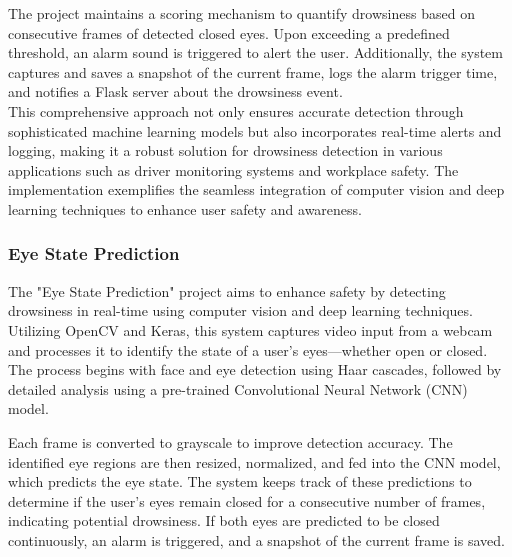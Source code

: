 \documentclass[12pt]{article}
\begin{document}
The project maintains a scoring mechanism to quantify drowsiness based on consecutive frames of detected closed eyes. Upon exceeding a predefined threshold, an alarm sound is triggered to alert the user. Additionally, the system captures and saves a snapshot of the current frame, logs the alarm trigger time, and notifies a Flask server about the drowsiness event. \\
This comprehensive approach not only ensures accurate detection through sophisticated machine learning models but also incorporates real-time alerts and logging, making it a robust solution for drowsiness detection in various applications such as driver monitoring systems and workplace safety. The implementation exemplifies the seamless integration of computer vision and deep learning techniques to enhance user safety and awareness.


\subsubsection{Eye State Prediction } 
The "Eye State Prediction" project aims to enhance safety by detecting drowsiness in real-time using computer vision and deep learning techniques. Utilizing OpenCV and Keras, this system captures video input from a webcam and processes it to identify the state of a user's eyes—whether open or closed. The process begins with face and eye detection using Haar cascades, followed by detailed analysis using a pre-trained Convolutional Neural Network (CNN) model. 

Each frame is converted to grayscale to improve detection accuracy. The identified eye regions are then resized, normalized, and fed into the CNN model, which predicts the eye state. The system keeps track of these predictions to determine if the user’s eyes remain closed for a consecutive number of frames, indicating potential drowsiness. If both eyes are predicted to be closed continuously, an alarm is triggered, and a snapshot of the current frame is saved. 
\end{document}
